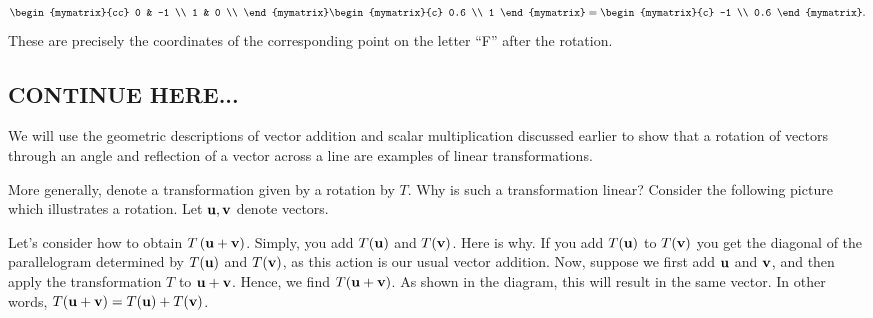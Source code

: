 \begin{solution}
\begin{equation*}
\begin{mymatrix}{cc}
      0 & -1 \\
      1 & 0 \\
    \end{mymatrix}
    \begin{mymatrix}{c} 0.6 \\ 1 \end{mymatrix}
    = \begin{mymatrix}{c} -1 \\ 0.6 \end{mymatrix}.
  \end{equation*}
  These are precisely the coordinates of the corresponding point on
  the letter ``F'' after the rotation.
\end{solution}

\subsection{CONTINUE HERE...}

We will use the geometric descriptions of vector addition
and scalar multiplication discussed earlier to show that a rotation of
vectors through an angle and reflection of a vector across a line are
examples of linear transformations.

More generally, denote a transformation given by a rotation by
$T$. Why is such a transformation linear? Consider the following
picture which illustrates a rotation. Let $\mbox{\bf u},\mbox{\bf v}$ denote
vectors.

\begin{center}
\end{center}

Let's consider how to obtain $T\left(\mbox{\bf u}+\mbox{\bf v}\right)$.
Simply, you add $T (\mbox{\bf u})$ and $T(\mbox{\bf v})$.
Here is why. If you add $T(\mbox{\bf u})$ to $T(\mbox{\bf v})$ you get
the diagonal of the parallelogram determined by $T(\mbox{\bf u})$ and $T(\mbox{\bf v})$, as this action
is our usual vector addition.
Now, suppose we first add $\mbox{\bf u}$ and $\mbox{\bf v}$, and then apply the transformation $T$ to
$\mbox{\bf u}+\mbox{\bf v}$. Hence, we find $T( \mbox{\bf u}+\mbox{\bf v})$.
As shown in the diagram, this will result in the same vector. In other words, $T(\mbox{\bf u}+\mbox{\bf v}) = T(\mbox{\bf u})
+ T(\mbox{\bf v})$.


